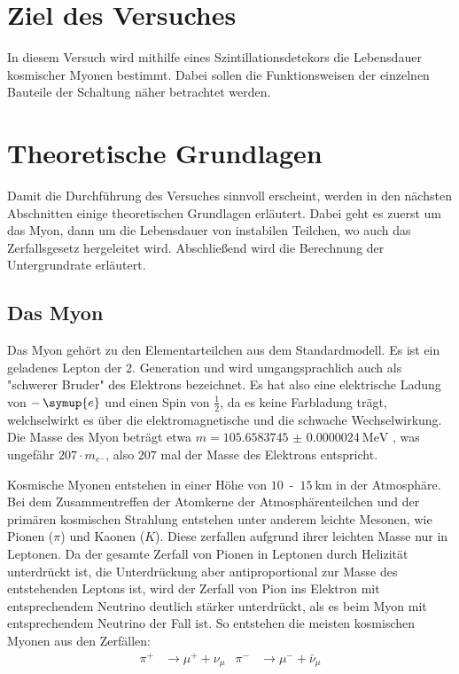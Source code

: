 \section{Ziel des Versuches}
\label{sec:ziel}

    \noindent In diesem Versuch wird mithilfe eines Szintillationsdetekors die Lebensdauer kosmischer Myonen bestimmt. 
    Dabei sollen die Funktionsweisen der einzelnen Bauteile der Schaltung näher betrachtet werden. 

\section{Theoretische Grundlagen}
\label{sec:Theorie}

    \noindent Damit die Durchführung des Versuches sinnvoll erscheint, werden in den nächsten Abschnitten einige theoretischen Grundlagen erläutert. 
    Dabei geht es zuerst um das Myon, dann um die Lebensdauer von instabilen Teilchen, wo auch das Zerfallsgesetz hergeleitet wird. Abschließend 
    wird die Berechnung der Untergrundrate erläutert. 

    \subsection{Das Myon}

        \noindent Das Myon gehört zu den Elementarteilchen aus dem Standardmodell. Es ist ein geladenes Lepton der 2. Generation und wird umgangsprachlich 
        auch als "schwerer Bruder" des Elektrons bezeichnet. Es hat also eine elektrische Ladung von $- \, \symup{e}$ und einen Spin von $\frac{1}{2}$, da es keine 
        Farbladung trägt, welchselwirkt es über die elektromagnetische und die schwache Wechselwirkung. Die Masse des Myon beträgt etwa $m = \SI{105.6583745(24)}{\mega\electronvolt}$ 
        \cite{pdg}, was ungefähr $207 \cdot m_{e^-}$, also $207$ mal der Masse des Elektrons entspricht.   

        \noindent Kosmische Myonen entstehen in einer Höhe von $\num{10}$\, -\, $\SI{15}{\kilo\metre}$ in der Atmosphäre. Bei dem Zusammentreffen der Atomkerne der Atmosphärenteilchen und der primären 
        kosmischen Strahlung entstehen unter anderem leichte Mesonen, wie Pionen ($\pi$) und Kaonen ($K$). Diese zerfallen aufgrund ihrer leichten Masse nur in Leptonen. Da der gesamte 
        Zerfall von Pionen in Leptonen durch Helizität unterdrückt ist, die Unterdrückung aber antiproportional zur Masse des entstehenden Leptons ist, wird der Zerfall von Pion ins 
        Elektron mit entsprechendem Neutrino deutlich stärker unterdrückt, als es beim Myon mit entsprechendem Neutrino der Fall ist. So entstehen die meisten kosmischen Myonen aus den 
        Zerfällen: 
        \begin{align*}
            \pi^+ &\rightarrow \mu^+ + \nu_{\mu} & \pi^- &\rightarrow \mu^- + \bar{\nu}_{\mu}
        \end{align*}

